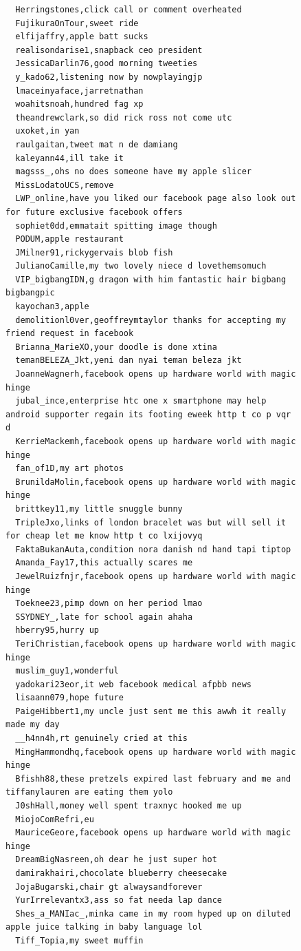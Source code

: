 \begin{figure}[htpb]
\begin{verbatim}
  Herringstones,click call or comment overheated
  FujikuraOnTour,sweet ride
  elfijaffry,apple batt sucks
  realisondarise1,snapback ceo president
  JessicaDarlin76,good morning tweeties
  y_kado62,listening now by nowplayingjp
  lmaceinyaface,jarretnathan
  woahitsnoah,hundred fag xp
  theandrewclark,so did rick ross not come utc
  uxoket,in yan
  raulgaitan,tweet mat n de damiang
  kaleyann44,ill take it
  magsss_,ohs no does someone have my apple slicer
  MissLodatoUCS,remove
  LWP_online,have you liked our facebook page also look out for future exclusive facebook offers
  sophiet0dd,emmatait spitting image though
  PODUM,apple restaurant
  JMilner91,rickygervais blob fish
  JulianoCamille,my two lovely niece d lovethemsomuch
  VIP_bigbangIDN,g dragon with him fantastic hair bigbang bigbangpic
  kayochan3,apple
  demolitionl0ver,geoffreymtaylor thanks for accepting my friend request in facebook
  Brianna_MarieXO,your doodle is done xtina
  temanBELEZA_Jkt,yeni dan nyai teman beleza jkt
  JoanneWagnerh,facebook opens up hardware world with magic hinge
  jubal_ince,enterprise htc one x smartphone may help android supporter regain its footing eweek http t co p vqr d
  KerrieMackemh,facebook opens up hardware world with magic hinge
  fan_of1D,my art photos
  BrunildaMolin,facebook opens up hardware world with magic hinge
  brittkey11,my little snuggle bunny
  TripleJxo,links of london bracelet was but will sell it for cheap let me know http t co lxijovyq
  FaktaBukanAuta,condition nora danish nd hand tapi tiptop
  Amanda_Fay17,this actually scares me
  JewelRuizfnjr,facebook opens up hardware world with magic hinge
  Toeknee23,pimp down on her period lmao
  SSYDNEY_,late for school again ahaha
  hberry95,hurry up
  TeriChristian,facebook opens up hardware world with magic hinge
  muslim_guy1,wonderful
  yadokari23eor,it web facebook medical afpbb news
  lisaann079,hope future
  PaigeHibbert1,my uncle just sent me this awwh it really made my day
  __h4nn4h,rt genuinely cried at this
  MingHammondhq,facebook opens up hardware world with magic hinge
  Bfishh88,these pretzels expired last february and me and tiffanylauren are eating them yolo
  J0shHall,money well spent traxnyc hooked me up
  MiojoComRefri,eu
  MauriceGeore,facebook opens up hardware world with magic hinge
  DreamBigNasreen,oh dear he just super hot
  damirakhairi,chocolate blueberry cheesecake
  JojaBugarski,chair gt alwaysandforever
  YurIrrelevantx3,ass so fat needa lap dance
  Shes_a_MANIac_,minka came in my room hyped up on diluted apple juice talking in baby language lol
  Tiff_Topia,my sweet muffin

\end{verbatim}
\end{figure}
